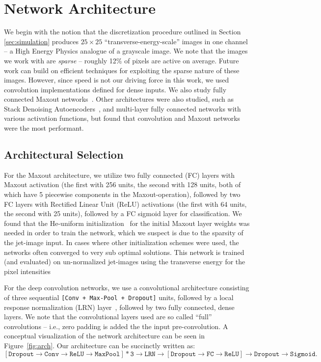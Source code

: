 
\section{Network Architecture}
\label{sec:arch}


We begin with the notion that the discretization procedure outlined in Section \ref{sec:simulation} produces $25\times 25$ ``transverse-energy-scale'' images in one channel -- a High Energy Physics analogue of a grayscale image. We note that the images we work with are \emph{sparse} -- roughly 12\% of pixels are active on average. Future work can build on efficient techniques for exploiting the sparse nature of these images. However, since speed is not our driving force in this work, we used convolution implementations defined for dense inputs.  We also study fully connected Maxout networks~\cite{maxout:goodfellow}.  Other architectures were also studied, such as Stack Denoising Autoencoders~\cite{SDAE}, and multi-layer fully connected networks with various activation functions, but found that convolution and Maxout networks were the most performant.

\subsection{Architectural Selection} %
\label{ssub:architectural_selection}
For the Maxout architecture, we utilize two fully connected (FC) layers with Maxout activation (the first with 256 units, the second with 128 units, both of which have 5 piecewise components in the Maxout-operation), followed by two FC layers with Rectified Linear Unit (ReLU) activations (the first with 64 units, the second with 25 units), followed by a FC sigmoid layer for classification. We found that the He-uniform initialization~\cite{HE_initialization} for the initial Maxout layer weights was needed in order to train the network, which we suspect is due to the sparsity of the jet-image input. In cases where other initialization schemes were used, the networks often converged to very sub optimal solutions.  This network is trained (and evaluated) on un-normalized jet-images using the transverse energy for the pixel intensities

For the deep convolution networks, we use a convolutional architecture consisting of three sequential \texttt{[Conv + Max-Pool + Dropout]} units, followed by a local response normalization (LRN) layer~\cite{dropout:and:LRN}, followed by two fully connected, dense layers. We note that the convolutional layers used are so called ``full'' convolutions -- i.e., zero padding is added the the input pre-convolution. A conceptual visualization of the network architecture can be seen in Figure~\ref{fig:arch}. Our architecture can be succinctly written as:
\begin{equation}
  \mathtt{[Dropout \rightarrow Conv \rightarrow ReLU \rightarrow MaxPool] * 3 \rightarrow LRN \rightarrow [Dropout \rightarrow FC \rightarrow ReLU]  \rightarrow Dropout \rightarrow Sigmoid}.
\end{equation}

